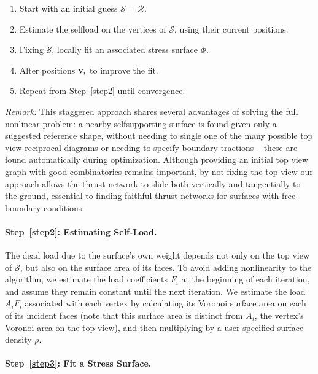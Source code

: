 \documentclass[annual]{acmsiggraph}
\def\SS{{\mathcal S}}
\def\RR{{\mathcal R}}
\begin{document}
\begin{enumerate}\itemsep-\parsep\setcounter{enumi}{-1}

\item Start with an initial guess $\SS = \RR$.

\item \label{step2} Estimate the self\dash load on the vertices of $\SS$,
using their current positions.

\item \label{step3} Fixing $\SS$, locally fit an associated stress surface $\Phi$.

\item \label{step4} Alter positions ${\mathbf v}_i$ to improve the fit.

\item Repeat from Step~\ref{step2} until convergence.

\end{enumerate}

{\it Remark:} This staggered approach shares several advantages of
solving the full nonlinear problem: a nearby self\dash supporting surface
is found given only a suggested reference shape, without needing to single
one of the many possible top view reciprocal diagrams or needing to
specify boundary tractions -- these are found automatically during
optimization. Although providing an initial top view graph with good
combinatorics remains important, by not fixing the top view our approach
allows the thrust network to slide both vertically and tangentially to the
ground, essential to finding faithful thrust networks for surfaces with
free boundary conditions.

\paragraph{Step~\ref{step2}: Estimating Self-Load.}

The dead load due to the surface's own weight depends not only on the top
view of $\SS$, but also on the surface area of its faces. To avoid adding
nonlinearity to the algorithm, we estimate the load coefficients $F_i$ at
the beginning of each iteration, and assume they remain constant until the
next iteration. We estimate the load $A_iF_i$ associated with each
vertex by calculating its Voronoi surface area on each of its incident faces
(note that this surface area is distinct from $A_i$, the vertex's Voronoi
area on the top view), and then multiplying by a user-specified surface density $\rho$.

\paragraph{Step~\ref{step3}: Fit a Stress Surface.}
\end{document}
